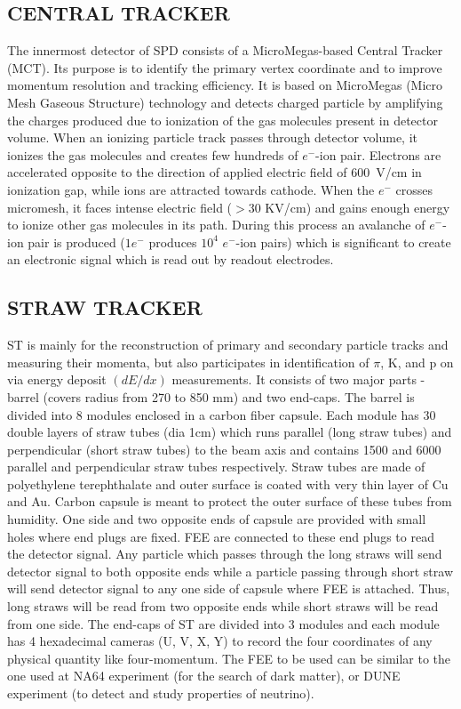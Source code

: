 \documentclass[12pt]{article}
\begin{document}
\subsection{CENTRAL TRACKER}
The innermost detector of SPD consists of a MicroMegas-based Central Tracker (MCT). Its purpose is to identify the primary vertex coordinate and to improve momentum resolution and tracking efficiency. It is based on MicroMegas (Micro Mesh Gaseous Structure) technology and detects charged particle by amplifying the charges produced due to ionization of the gas molecules present in detector volume. When an ionizing particle track passes through detector volume, it ionizes the gas molecules and creates few hundreds of $e^{-}$-ion pair. Electrons are accelerated opposite to the direction of applied electric field of $600$~V/cm in ionization gap, while ions are attracted towards cathode. When the $e^{-}$ crosses micromesh, it faces intense electric field ($>30$ KV/cm) and gains enough energy to ionize other gas molecules in its path. During this process an avalanche of $e^{-}$-ion pair is produced ($1e^{-}$ produces $10^4$ $e^{-}$-ion pairs) which is significant to create an electronic signal which is read out by readout electrodes.   

\subsection{STRAW TRACKER}
\label{STRAW TRACKER}
ST is mainly for the reconstruction of primary and secondary particle tracks and measuring their momenta, but also participates in identification of $\pi$, K, and p on via energy deposit $(dE/dx)$ measurements. It consists of two major parts - barrel (covers radius from 270 to 850 mm) and two end-caps. The barrel is divided into 8 modules enclosed in a carbon fiber capsule. Each module has 30 double layers of straw tubes (dia 1cm) which runs parallel (long straw tubes) and perpendicular (short straw tubes) to the beam axis and contains 1500 and 6000 parallel and perpendicular straw tubes respectively. Straw tubes are made of polyethylene terephthalate and outer surface is coated with very thin layer of Cu and Au. Carbon capsule is meant to protect the outer surface of these tubes from humidity. One side and two opposite ends of capsule are provided with small holes where end plugs are fixed. FEE are connected to these end plugs to read the detector signal. Any particle which passes through the long straws will send detector signal to both opposite ends while a particle passing through short straw will send detector signal to any one side of capsule where FEE is attached. Thus, long straws will be read from two opposite ends while short straws will be read from one side. The end-caps of ST are divided into 3 modules and each module has 4 hexadecimal cameras (U, V, X, Y) to record the four coordinates of any physical quantity like four-momentum. The FEE to be used can be similar to the one used at NA64 experiment (for the search of dark matter), or DUNE experiment (to detect and study properties of neutrino).
\end{document}
